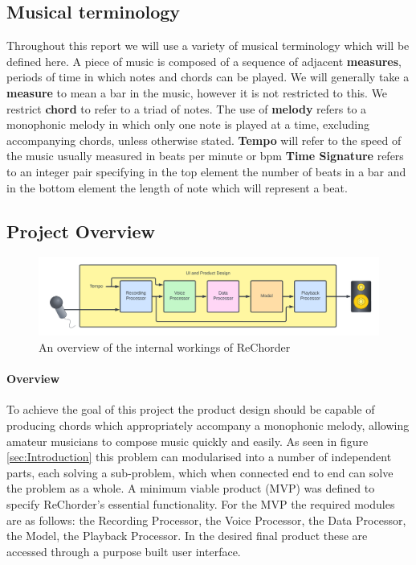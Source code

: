 \subsection{Musical terminology}

Throughout this report we will use a variety of musical terminology which will be defined here. A piece of music is composed of a sequence of adjacent \textbf{measures}, periods of time in which notes and chords can be played. 
We will generally take a \textbf{measure} to mean a bar in the music, however it is not restricted to this. We restrict \textbf{chord} to refer to a triad of notes.%
 The use of \textbf{melody} refers to a monophonic melody in which only one note is played at a time, excluding accompanying chords, unless otherwise stated.
\textbf{Tempo} will refer to the speed of the music usually measured in beats per minute or bpm
\textbf{Time Signature} refers to an integer pair specifying in the top element the number of beats in a bar and in the bottom element the length of note which will represent a beat.

\subsection{Project Overview}
\begin{figure}
    \centering
    \includegraphics[width=0.8\columnwidth]{Figures/Project Overview}
    \decoRule
    \caption[]{An overview of the internal workings of ReChorder}
    \label{fig:MVPOverview}
\end{figure}

\paragraph{Overview}
To achieve the goal of this project the product design should be capable of producing chords which appropriately accompany a monophonic melody, allowing amateur musicians to compose music quickly and easily.
As seen in figure \ref{sec:Introduction} this problem can modularised into a number of independent parts, each solving a sub-problem, which when connected end to end can solve the problem as a whole.
A minimum viable product (MVP) was defined to specify ReChorder's essential functionality.
For the MVP the required modules are as follows: the Recording Processor, the Voice Processor, the Data Processor, the Model, the Playback Processor.
In the desired final product these are accessed through a purpose built user interface.

